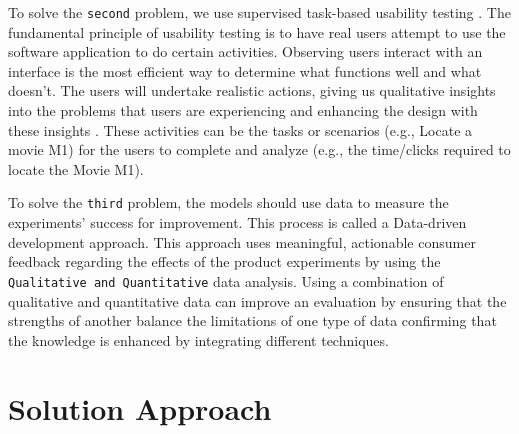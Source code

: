 To solve the \texttt{second} problem, we use supervised task-based usability testing \cite{article:dataanalysis:supervisedtest}.
The fundamental principle of usability testing is to have real users attempt to use the software application to do certain activities.
Observing users interact with an interface is the most efficient way to determine what functions well and what doesn't.
The users will undertake realistic actions, giving us qualitative insights into the problems that users are experiencing and enhancing the design with these insights \cite{misc:usability:tasks}.
These activities can be the tasks or scenarios (e.g., Locate a movie M1) for the users to complete and analyze (e.g., the time/clicks required to locate the Movie M1).

To solve the \texttt{third} problem, the models should use data to measure the experiments' success for improvement. This process is called a Data-driven development approach. 
This approach uses meaningful, actionable consumer feedback regarding the effects of the product experiments by using the \texttt{Qualitative and Quantitative} data analysis.
Using a combination of qualitative and quantitative data can improve an evaluation by ensuring that the strengths of another balance the limitations of one type of data confirming that the knowledge is enhanced by integrating different techniques.


\section{Solution Approach}
\label{intro:section:solution}

